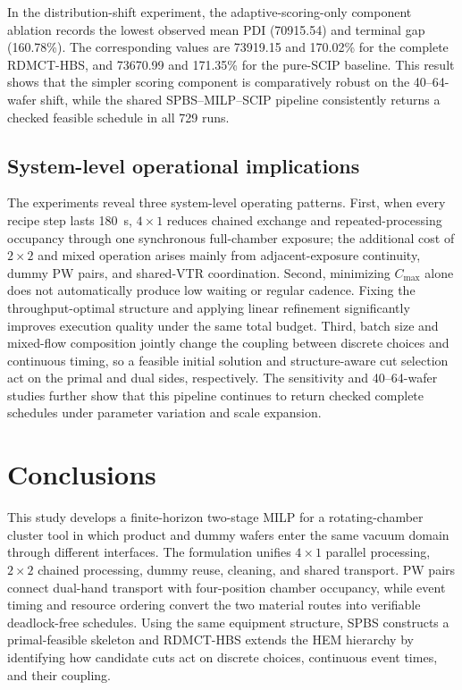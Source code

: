 \documentclass[final,5p,times,twocolumn]{elsarticle}
\newcommand{\method}{RDMCT-HBS}
\begin{document}
In the distribution-shift experiment, the adaptive-scoring-only component ablation records the lowest observed mean PDI (70915.54) and terminal gap (160.78\%). The corresponding values are 73919.15 and 170.02\% for the complete \method{}, and 73670.99 and 171.35\% for the pure-SCIP baseline. This result shows that the simpler scoring component is comparatively robust on the 40--64-wafer shift, while the shared SPBS--MILP--SCIP pipeline consistently returns a checked feasible schedule in all 729 runs.

\subsection{System-level operational implications}

The experiments reveal three system-level operating patterns. First, when every recipe step lasts 180~s, $4\times1$ reduces chained exchange and repeated-processing occupancy through one synchronous full-chamber exposure; the additional cost of $2\times2$ and mixed operation arises mainly from adjacent-exposure continuity, dummy PW pairs, and shared-VTR coordination. Second, minimizing $C_{\max}$ alone does not automatically produce low waiting or regular cadence. Fixing the throughput-optimal structure and applying linear refinement significantly improves execution quality under the same total budget. Third, batch size and mixed-flow composition jointly change the coupling between discrete choices and continuous timing, so a feasible initial solution and structure-aware cut selection act on the primal and dual sides, respectively. The sensitivity and 40--64-wafer studies further show that this pipeline continues to return checked complete schedules under parameter variation and scale expansion.

\FloatBarrier

\section{Conclusions}

This study develops a finite-horizon two-stage MILP for a rotating-chamber cluster tool in which product and dummy wafers enter the same vacuum domain through different interfaces. The formulation unifies $4\times1$ parallel processing, $2\times2$ chained processing, dummy reuse, cleaning, and shared transport. PW pairs connect dual-hand transport with four-position chamber occupancy, while event timing and resource ordering convert the two material routes into verifiable deadlock-free schedules. Using the same equipment structure, SPBS constructs a primal-feasible skeleton and \method{} extends the HEM hierarchy by identifying how candidate cuts act on discrete choices, continuous event times, and their coupling.
\end{document}
